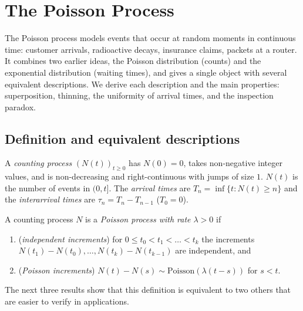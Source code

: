 \chapter{The Poisson Process}
\label{ch:poisson}

The Poisson process models events that occur at random moments in continuous time:
customer arrivals, radioactive decays, insurance claims, packets at a router. It
combines two earlier ideas, the Poisson distribution (counts) and the exponential
distribution (waiting times), and gives a single object with several equivalent
descriptions. We derive each description and the main properties: superposition,
thinning, the uniformity of arrival times, and the inspection paradox.

\section{Definition and equivalent descriptions}

\begin{definition}
A \emph{counting process} $(N(t))_{t\ge0}$ has $N(0)=0$, takes non-negative integer
values, and is non-decreasing and right-continuous with jumps of size $1$. $N(t)$ is the
number of events in $(0,t]$. The \emph{arrival times} are $T_n=\inf\{t:N(t)\ge n\}$ and
the \emph{interarrival times} are $\tau_n=T_n-T_{n-1}$ ($T_0=0$).
\end{definition}

\begin{definition}\label{def:pp}
A counting process $N$ is a \emph{Poisson process with rate $\lambda>0$} if
\begin{enumerate}[label=(\roman*)]
\item (\emph{independent increments}) for $0\le t_0<t_1<\dots<t_k$ the increments
$N(t_1)-N(t_0),\dots,N(t_k)-N(t_{k-1})$ are independent, and
\item (\emph{Poisson increments}) $N(t)-N(s)\sim\mathrm{Poisson}(\lambda(t-s))$ for $s<t$.
\end{enumerate}
\end{definition}

The next three results show that this definition is equivalent to two others that are
easier to verify in applications.

